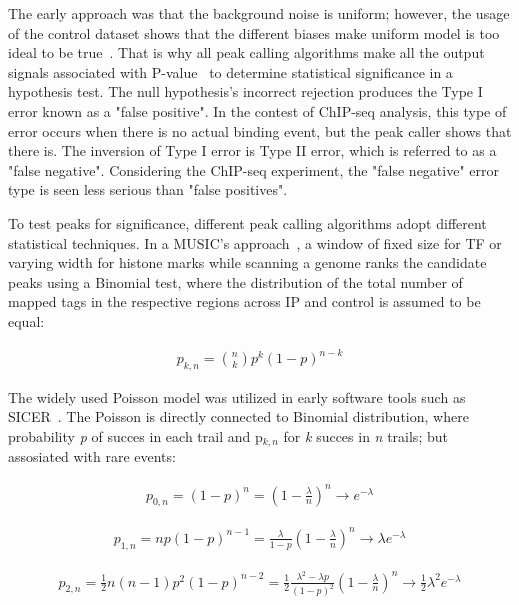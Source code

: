 The early approach was that the background noise is uniform; 
however, the usage of the control dataset shows that the different biases make uniform model is too ideal to be true~\cite{robertson2007genome}. 
That is why all peak calling algorithms make all the output signals associated with P-value~\cite{chitpin2019recap} to determine statistical significance in a hypothesis test. 
The null hypothesis's incorrect rejection produces the Type I error known as a "false positive". 
In the contest of ChIP-seq analysis, this type of error occurs when there is no actual binding event, but the peak caller shows that there is. 
The inversion of Type I error is Type II error, which is referred to as a "false negative". 
Considering the ChIP-seq experiment, the "false negative" error type is seen less serious than "false positives". 

To test peaks for significance, different peak calling algorithms adopt different statistical techniques. 
In a MUSIC's approach~\cite{harmanci2014music}, a window of fixed size for TF or varying width for histone marks while scanning a genome ranks the candidate peaks using a Binomial test, where the distribution of the total number of mapped tags in the respective regions across IP and control is assumed to be equal:

\begin{align*}
    p_{k,n} = \binom{n}{k}p^k(1-p)^{n-k}
\end{align*}

The widely used Poisson model was utilized in early software tools such as SICER~\cite{zang2009clustering}. 
The Poisson is directly connected to Binomial distribution,
where probability \textit{p} of succes in each trail and p$_{k,n}$  for \textit{k} succes in \textit{n} trails; but assosiated with rare events:

\begin{align*}
    p_{0,n} = (1 - p)^{n} = \left(1-{\frac{\lambda}{n}}\right)^{n} \to e^{-\lambda}
\end{align*}

\begin{align*}
    p_{1,n} = np(1 - p)^{n-1} = \frac{\lambda}{1-p}\left(1-{\frac{\lambda}{n}}\right)^{n} \to \lambda e^{-\lambda}
\end{align*}

\begin{align*}
    p_{2,n} = \frac{1}{2} n(n - 1) p^{2} (1-p)^{n-2} = \frac{1}{2} \frac{\lambda^{2} - \lambda p}{ (1-p)^{2}} \left(1-{\frac{\lambda}{n}}\right)^{n} \to \frac{1}{2} \lambda^{2} e^{-\lambda}
\end{align*}

